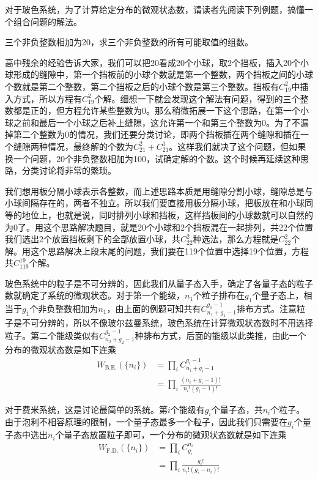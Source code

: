 \documentclass[../../main.tex]{subfiles}
\begin{document}
对于玻色系统，为了计算给定分布的微观状态数，请读者先阅读下列例题，搞懂一个组合问题的解法。
\begin{example}
    三个非负整数相加为20，求三个非负整数的所有可能取值的组数。
    \begin{solution}
        高中残余的经验告诉大家，我们可以把20看成20个小球，取2个挡板，插入20个小球形成的缝隙中，第一个挡板前的小球个数就是第一个整数，两个挡板之间的小球个数就是第二个整数，第二个挡板之后的小球个数是第三个整数。挡板有\(C_{19}^2\)中插入方式，所以方程有\(C_{19}^2\)个解。细想一下就会发现这个解法有问题，得到的三个整数都是正的，但方程允许某些整数为0。那么稍微拓展一下这个思路，在第一个小球之前和最后一个小球之后补上缝隙，这允许第一个和第三个整数为0。为了不漏掉第二个整数为0的情况，我们还要分类讨论，即两个挡板插在两个缝隙和插在一个缝隙两种情况，最终解的个数为\(C_{21}^2+C_{21}^1\)。这样我们就决了这个问题，但如果换一个问题，20个非负整数相加为100，试确定解的个数。这个时候再延续这种思路，分类讨论将非常的繁琐。

        我们想用板分隔小球表示各整数，而上述思路本质是用缝隙分割小球，缝隙总是与小球间隔存在的，两者不独立。所以我们要直接用板分隔小球，把板放在和小球同等的地位上，也就是说，同时排列小球和挡板，这样挡板间的小球数就可以自然的为0了。用这个思路解决题目，就是20个小球和2个挡板混在一起排列，共22个位置我们选出2个放置挡板剩下的全部放置小球，共\(C_{22}^2\)种选法，那么方程就是\(C_{22}^2\)个解。用这个思路解决上段末尾的问题，我们要在119个位置中选择19个位置，方程共\(C_{119}^{19}\)个解。
    \end{solution}
\end{example}
玻色系统中的粒子是不可分辨的，因此我们从量子态入手，确定了各量子态的粒子数就确定了系统的微观状态。对于第一个能级，\(n_1\)个粒子排布在\(g_1\)个量子态上，相当于\(g_1\)个非负整数相加为\(n_1\)，由上面的例题可知共有\(C_{n_1+g_1-1}^{g_1-1}\)排布方式。注意粒子是不可分辨的，所以不像玻尔兹曼系统，玻色系统在计算微观状态数时不用选择粒子。第二个能级类似有\(C_{n_2+g_2-1}^{g_2-1}\)种排布方式，后面的能级以此类推，由此一个分布的微观状态数是如下连乘
\begin{equation}
    \begin{split}
        W_{\mathrm{B.E.}}\left(\{n_i\}\right)&=\prod_i C_{n_i+g_i-1}^{g_i-1} \\
        &=\prod_i \frac{(n_i+g_i-1)!}{n_i !(g_i-1)!}
    \end{split}
\end{equation}

对于费米系统，这是讨论最简单的系统。第\(i\)个能级有\(g_i\)个量子态，共\(n_i\)个粒子。由于泡利不相容原理的限制，一个量子态最多一个粒子，因此我们只需要在\(g_i\)个量子态中选出\(n_i\)个量子态放置粒子即可，一个分布的微观状态数就是如下连乘
\begin{equation}
    \begin{split}
        W_{\mathrm{F.D.}}\left(\{n_i\}\right)&=\prod_i C_{g_i}^{n_i} \\
        &=\prod_i \frac{g_i!}{n_i !(g_i-n_i)!}
    \end{split}
\end{equation}
\end{document}

